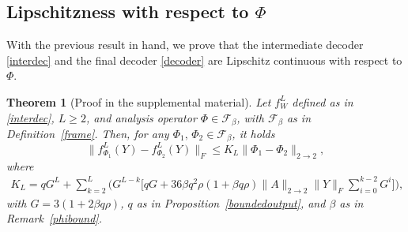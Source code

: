 \documentclass[preprint,12pt]{elsarticle}
\newtheorem{theorem}{Theorem}[section]
\newcommand{\opnorm}{2\rightarrow2}
\begin{document}
\subsection{Lipschitzness with respect to $\Phi$}\label{lipsec}
With the previous result in hand, we prove that the intermediate decoder \eqref{interdec} and the final decoder \eqref{decoder} are Lipschitz continuous with respect to $\Phi$.

\begin{theorem}[Proof in the supplemental material]
\label{lipschitz}
    Let $f^L_W$ defined as in \eqref{interdec}, $L\geq2$, and analysis operator $\Phi\in\mathcal{F}_{\beta}$, with $\mathcal{F}_{\beta }$ as in Definition~\ref{frame}. Then, for any $\Phi_1,\,\Phi_2\in\mathcal{F}_{\beta }$, it holds
    \begin{equation}
    \|f^L_{\Phi_1}(Y)-f^L_{\Phi_2}(Y)\|_F\leq K_L\|\Phi_1-\Phi_2\|_{2\rightarrow2},
\end{equation} where
\begin{multline}
\label{fpert}
    K_L=qG^L+\sum_{k=2}^L\Bigg(G^{L-k}\bigg[qG+36\beta q^2\rho(1+\beta q\rho)\|A\|_{\opnorm}\|Y\|_F\sum_{i=0}^{k-2}G^i\bigg]\Bigg),
\end{multline}
with $G=3(1+2\beta q\rho)$, $q$ as in Proposition~\ref{boundedoutput}, and $\beta$ as in Remark~\ref{phibound}.
\end{theorem}
\end{document}
